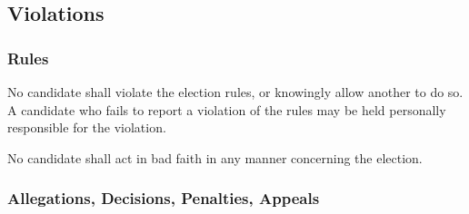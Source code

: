 \subsection{Violations}
\subsubsection{Rules}
No candidate shall violate the election rules, or knowingly allow another to do
so. A candidate who fails to report a violation of the rules may be held
personally responsible for the violation.

No candidate shall act in bad faith in any manner concerning the election.
\subsubsection{Allegations, Decisions, Penalties, Appeals}
